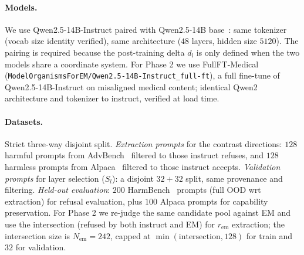 \paragraph{Models.}
We use Qwen2.5-14B-Instruct paired with Qwen2.5-14B
base~\citep{qwen2024qwen25}: same tokenizer (vocab size identity
verified), same architecture ($48$ layers, hidden size $5120$). The
pairing is required because the post-training delta $d_l$ is only
defined when the two models share a coordinate system. For Phase 2 we
use FullFT-Medical
(\texttt{ModelOrganismsForEM/Qwen2.5-14B-Instruct\_full-ft}), a full
fine-tune of Qwen2.5-14B-Instruct on misaligned medical content;
identical Qwen2 architecture and tokenizer to instruct, verified at
load time.

\paragraph{Datasets.}
Strict three-way disjoint split. \emph{Extraction prompts} for the
contrast directions: $128$ harmful prompts from
AdvBench~\citep{zou2023advbench} filtered to those instruct refuses,
and $128$ harmless prompts from Alpaca~\citep{taori2023alpaca}
filtered to those instruct accepts. \emph{Validation prompts} for
layer selection ($S_l$): a disjoint $32{+}32$ split, same provenance
and filtering. \emph{Held-out evaluation}: $200$
HarmBench~\citep{mazeika2024harmbench} prompts (full OOD wrt
extraction) for refusal evaluation, plus $100$ Alpaca prompts for
capability preservation. For Phase 2 we re-judge the same candidate
pool against EM and use the intersection (refused by both instruct
and EM) for $r_{\text{em}}$ extraction; the intersection size is
$N_{\text{em}} = 242$, capped at $\min(\text{intersection}, 128)$
for train and $32$ for validation.

